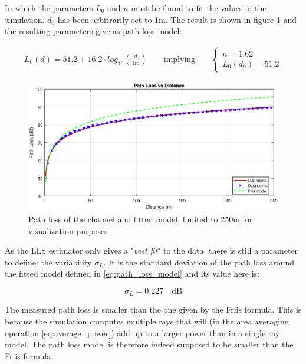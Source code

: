 \documentclass[10pt,a4paper]{ULBreport}
\begin{document}
In which the parameters $L_0$ and $n$ must be found to fit the values of the simulation. $d_0$ has been arbitrarily set to 1m. The result is shown in figure \ref{fig:path_loss} and the resulting parameters give as path loss model:

\begin{align}
    \label{eq:path_loss_model}
    L_0(d) = 51.2 + 16.2 \cdot log_{10} \left(\frac{d}{1\text{m}}\right)
    \qquad
    \text{implying} \qquad \left\{
    \begin{array}{l}
        n = 1.62 \\
        L_0(d_0) = 51.2
    \end{array}
    \right.
\end{align}

\begin{figure}[H]
    \centering
    \includegraphics[width=1\textwidth]{3_5_model.eps}
    \caption{Path loss of the channel and fitted model, limited to 250m for visualization purposes}
    \label{fig:path_loss}
\end{figure}

As the LLS estimator only gives a "\textit{best fit}" to the data, there is still a parameter to define: the variability $\sigma_L$. It is the standard deviation of the path loss around the fitted model defined in \ref{eq:path_loss_model} and its value here is:

\begin{equation*}
    \sigma_L = 0.227 \quad \text{dB}
\end{equation*}

The measured path loss is smaller than the one given by the Friis formula. This is because the simulation computes multiple rays that will (in the area averaging operation \ref{eq:average_power}) add up to a larger power than in a single ray model. The path loss model is therefore indeed supposed to be smaller than the Friis formula. \\
\end{document}
